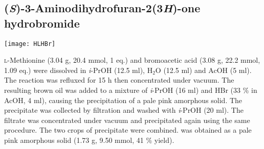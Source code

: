 {{{{{{{{{{{{{{{{\subsection{(\textit{S})-3-Aminodihydrofuran-2(3\textit{H})-one hydrobromide }


\begin{scheme}[H]
	\begin{center}
		\texttt{[image: HLHBr]}
	\end{center}
\end{scheme}

\textsc{l}-Methionine  (3.04 g, 20.4 mmol, 1 eq.) and bromoacetic acid  (3.08 g, 22.2 mmol, 1.09 eq.) were dissolved in \textit{i}-PrOH (12.5 ml), H$_2$O (12.5 ml) and AcOH (5 ml). The reaction was refluxed for 15 h then concentrated under vacuum. The resulting brown oil was added to a mixture of \textit{i}-PrOH (16 ml) and HBr (33 \% in AcOH, 4 ml), causing the precipitation of a pale pink amorphous solid. The precipitate was collected by filtration and washed with \textit{i}-PrOH (20 ml). The filtrate was concentrated under vacuum and precipitated again using the same procedure. The two crops of precipitate were combined.  was obtained as a pale pink amorphous solid (1.73 g, 9.50 mmol, 41 \% yield).
\\[1\baselineskip]
\\[1\baselineskip]
\\[1\baselineskip]
\\[1\baselineskip]
\\[1\baselineskip]
}}}}}}}}}}}}}}}}
